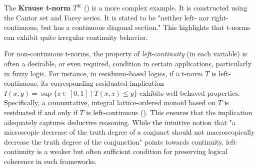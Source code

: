 The \textbf{Krause t-norm $T^K$} (\cite[App.~B.1, Thm.~B.1]{Klement2000}) is a more complex example. It is constructed using the Cantor set and Farey series. It is stated to be "neither left- nor right-continuous, but has a continuous diagonal section." This highlights that t-norms can exhibit quite irregular continuity behavior.

\begin{remark}
For non-continuous t-norms, the property of \emph{left-continuity} (in each variable) is often a desirable, or even required, condition in certain applications, particularly in fuzzy logic. For instance, in residuum-based logics, if a t-norm $T$ is left-continuous, its corresponding residuated implication $I(x,y) = \sup\{z \in [0,1] \mid T(x,z) \le y\}$ exhibits well-behaved properties. Specifically, a commutative, integral lattice-ordered monoid based on $T$ is residuated if and only if $T$ is left-continuous (\cite[Prop.~2.47, p.~63]{Klement2000}). This ensures that the implication adequately captures deductive reasoning. While the intuitive notion that "a microscopic decrease of the truth degree of a conjunct should not macroscopically decrease the truth degree of the conjunction" points towards continuity, left-continuity is a weaker but often sufficient condition for preserving logical coherence in such frameworks.
\end{remark}
